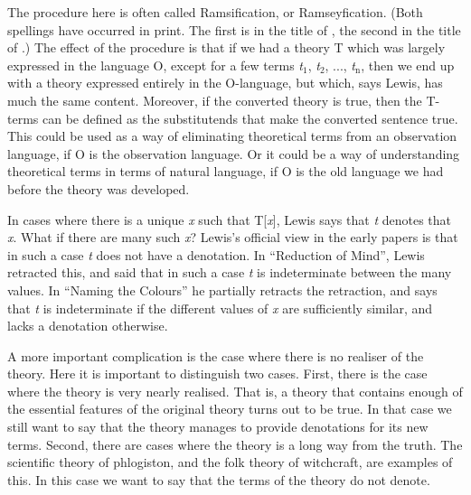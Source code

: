 The procedure here is often called Ramsification, or Ramseyfication. (Both spellings have occurred in print. The first is in the title of \citet{DBMNola1997}, the second in the title of \citet{MeliaSaatsi2006}.) The effect of the procedure is that if we had a theory T which was largely expressed in the language O, except for a few terms \textit{t}\(_\text{1}\), \textit{t}\(_\text{2}\), ..., \textit{t\(_\text{n}\)}, then we end up with a theory expressed entirely in the O-language, but which, says Lewis, has much the same content. Moreover, if the converted theory is true, then the T-terms can be defined as the substitutends that make the converted sentence true. This could be used as a way of eliminating theoretical terms from an observation language, if O is the observation language. Or it could be a way of understanding theoretical terms in terms of natural language, if O is the old language we had before the theory was developed.

In cases where there is a unique \textit{x} such that T[\textit{x}], Lewis says that \textit{t} denotes that \textit{x}. What if there are many such \textit{x}? Lewis's official view in the early papers is that in such a case \textit{t} does not have a denotation. In ``Reduction of Mind'', Lewis retracted this, and said that in such a case \textit{t} is indeterminate between the many values. In ``Naming the Colours'' he partially retracts the retraction, and says that \textit{t} is indeterminate if the different values of \textit{x} are sufficiently similar, and lacks a denotation otherwise.

A more important complication is the case where there is no realiser of the theory. Here it is important to distinguish two cases. First, there is the case where the theory is very nearly realised. That is, a theory that contains enough of the essential features of the original theory turns out to be true. In that case we still want to say that the theory manages to provide denotations for its new terms. Second, there are cases where the theory is a long way from the truth. The scientific theory of phlogiston, and the folk theory of witchcraft, are examples of this. In this case we want to say that the terms of the theory do not denote.


